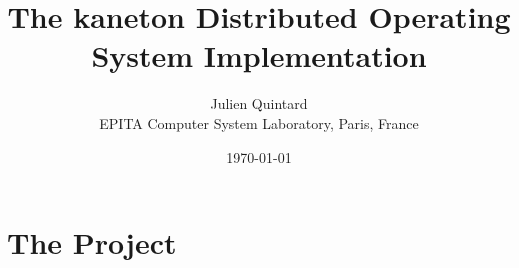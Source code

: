 \documentclass[10pt,a4wide]{article}
\title{The kaneton Distributed Operating System Implementation}
\author{\small{Julien Quintard} \\
        \scriptsize{EPITA Computer System Laboratory, Paris, France}}
\date{\scriptsize{\today}}
\begin{document}
\maketitle


\begin{abstract}

\end{abstract}

%
%



\section{The Project}
\end{document}
